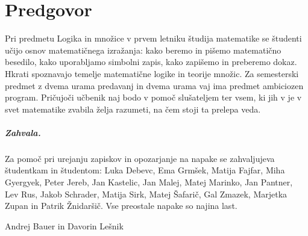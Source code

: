 \chapter*{Predgovor}
\label{chap:predgovor}

Pri predmetu Logika in množice v prvem letniku študija matematike se študenti
učijo osnov matematičnega izražanja: kako beremo in pišemo matematično besedilo, kako
uporabljamo simbolni zapis, kako zapišemo in preberemo dokaz.
%
Hkrati spoznavajo temelje matematične logike in teorije množic.
%
Za semesterski predmet z dvema urama predavanj in dvema urama vaj ima predmet ambiciozen program.
Pričujoči učbenik naj bodo v pomoč slušateljem ter vsem, ki jih v je v svet matematike zvabila želja razumeti, na čem stoji ta prelepa veda.

\paragraph{Zahvala.}
%
Za pomoč pri urejanju zapiskov in opozarjanje na napake se zahvaljujeva študentkam in študentom:
%
Luka Debevc,
Ema Grmšek,
Matija Fajfar,
Miha Gyergyek,
Peter Jereb,
Jan Kastelic,
Jan Malej,
Matej Marinko,
Jan Pantner,
Lev Rus,
Jakob Schrader,
Matija Sirk,
Matej Šafarič,
Gal Zmazek,
Marjetka Zupan in Patrik Žnidaršič.
%
Vse preostale napake so najina last.
\bigskip

\begin{flushright}
Andrej Bauer in Davorin Lešnik
\end{flushright}

\bigskip


